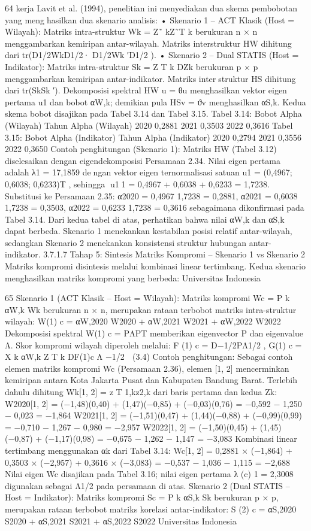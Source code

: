 64
kerja Lavit et al. (1994), penelitian ini menyediakan dua skema pembobotan yang menghasilkan dua skenario analisis:
• Skenario 1 – ACT Klasik (Host = Wilayah): Matriks intra-struktur Wk = Z˜
kZ˜T
k
berukuran n × n menggambarkan kemiripan antar-wilayah. Matriks interstruktur
HW dihitung dari tr(D1/2WkD1/2· D1/2Wk
′D1/2
).
• Skenario 2 – Dual STATIS (Host = Indikator): Matriks intra-struktur Sk =
Z
T
k DZk berukuran p × p menggambarkan kemiripan antar-indikator. Matriks interstruktur HS dihitung dari tr(SkSk
′).
Dekomposisi spektral HW u = θu menghasilkan vektor eigen pertama u1 dan bobot
αW,k; demikian pula HSv = ϑv menghasilkan αS,k. Kedua skema bobot disajikan pada
Tabel 3.14 dan Tabel 3.15.
Tabel 3.14: Bobot Alpha (Wilayah)
Tahun Alpha (Wilayah)
2020 0,2881
2021 0,3503
2022 0,3616
Tabel 3.15: Bobot Alpha (Indikator)
Tahun Alpha (Indikator)
2020 0,2794
2021 0,3556
2022 0,3650
Contoh penghitungan (Skenario 1): Matriks HW (Tabel 3.12) diselesaikan dengan
eigendekomposisi Persamaan 2.34. Nilai eigen pertama adalah λ1 = 17,1859 dengan vektor eigen ternormalisasi satuan u1 = (0,4967; 0,6038; 0,6233)T
, sehingga
∥u1∥1 = 0,4967 + 0,6038 + 0,6233 = 1,7238. Substitusi ke Persamaan 2.35:
α2020 =
0,4967
1,7238
= 0,2881, α2021 =
0,6038
1,7238
= 0,3503, α2022 =
0,6233
1,7238
= 0,3616
sebagaimana dikonfirmasi pada Tabel 3.14.
Dari kedua tabel di atas, perhatikan bahwa nilai αW,k dan αS,k dapat berbeda.
Skenario 1 menekankan kestabilan posisi relatif antar-wilayah, sedangkan Skenario 2
menekankan konsistensi struktur hubungan antar-indikator.
3.7.1.7 Tahap 5: Sintesis Matriks Kompromi – Skenario 1 vs Skenario 2
Matriks kompromi disintesis melalui kombinasi linear tertimbang. Kedua skenario
menghasilkan matriks kompromi yang berbeda:
Universitas Indonesia

65
Skenario 1 (ACT Klasik – Host = Wilayah): Matriks kompromi Wc =
P
k αW,k Wk
berukuran n × n, merupakan rataan terbobot matriks intra-struktur wilayah:
W(1)
c = αW,2020 W2020 + αW,2021 W2021 + αW,2022 W2022
Dekomposisi spektral W(1)
c = PΛPT memberikan eigenvector P dan eigenvalue Λ. Skor
kompromi wilayah diperoleh melalui:
F
(1)
c = D−1/2PΛ1/2
, G(1)
c =
X
k
αW,k Z
T
k DF(1)c Λ
−1/2

(3.4)
Contoh penghitungan: Sebagai contoh elemen matriks kompromi Wc (Persamaan 2.36),
elemen [1, 2] mencerminkan kemiripan antara Kota Jakarta Pusat dan Kabupaten Bandung
Barat. Terlebih dahulu dihitung Wk[1, 2] = z
T
1,kz2,k dari baris pertama dan kedua Zk:
W2020[1, 2] = (−1,48)(0,40) + (1,47)(−0,85) + (−0,03)(0,76)
= −0,592 − 1,250 − 0,023 = −1,864
W2021[1, 2] = (−1,51)(0,47) + (1,44)(−0,88) + (−0,99)(0,99)
= −0,710 − 1,267 − 0,980 = −2,957
W2022[1, 2] = (−1,50)(0,45) + (1,45)(−0,87) + (−1,17)(0,98)
= −0,675 − 1,262 − 1,147 = −3,083
Kombinasi linear tertimbang menggunakan αk dari Tabel 3.14:
Wc[1, 2] = 0,2881 × (−1,864) + 0,3503 × (−2,957) + 0,3616 × (−3,083)
= −0,537 − 1,036 − 1,115 = −2,688
Nilai eigen Wc disajikan pada Tabel 3.16; nilai eigen pertama λ
(c)
1 = 2,3008 digunakan
sebagai Λ1/2 pada persamaan di atas.
Skenario 2 (Dual STATIS – Host = Indikator): Matriks kompromi Sc =
P
k αS,k Sk
berukuran p × p, merupakan rataan terbobot matriks korelasi antar-indikator:
S
(2)
c = αS,2020 S2020 + αS,2021 S2021 + αS,2022 S2022
Universitas Indonesia

